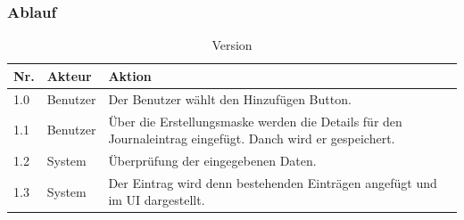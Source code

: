 \subsubsection{Ablauf}
\begin{table}[H]
 \caption{Version}
 \begin{tabularx}{\textwidth}{|l|l|X|}
     \hline
     \textbf{Nr.} & \textbf{Akteur} & \textbf{Aktion} \\
     \hline
     1.0          & Benutzer        & Der Benutzer w\"{a}hlt den Hinzuf\"{u}gen Button. \\
     \hline
     1.1          & Benutzer        & \"{U}ber die Erstellungsmaske werden die Details f\"{u}r den Journaleintrag eingef\"{u}gt. Danch wird er gespeichert. \\
     \hline
     1.2          & System          & \"{U}berpr\"{u}fung der eingegebenen Daten.  \\
     \hline
     1.3          & System          & Der Eintrag wird denn bestehenden Eintr\"{a}gen angef\"{u}gt und im UI dargestellt. \\
     \hline
 \end{tabularx}
 \label{table: Version}
\end{table}
